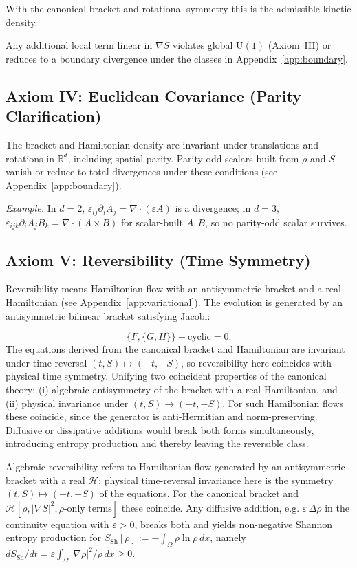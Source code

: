 \documentclass[11pt,a4paper]{article}
\numberwithin{equation}{section}
\theoremstyle{thmcompact}
\theoremstyle{remark}
\begin{document}
With the canonical bracket and rotational symmetry this is the admissible kinetic density.

Any additional local term linear in $\nabla S$ violates global $\mathrm{U}(1)
$ (Axiom~III)
or reduces to a boundary divergence under the classes in Appendix~\ref{app:boundary}.
	
	\subsection*{Axiom IV: Euclidean Covariance (Parity Clarification)}
	The bracket and Hamiltonian density are invariant under translations and rotations in $\mathbb R^d$, including spatial parity.
	Parity-odd scalars built from $\rho$ and $S$ vanish or reduce to total divergences under these conditions (see Appendix~\ref{app:boundary}).
	
	\textit{Example.} In $d=2$, $\varepsilon_{ij}\partial_{i}A_{j}=\nabla\!\cdot(\varepsilon A)$ is a divergence; in $d=3$, $\varepsilon_{ijk}\partial_{i}A_{j}B_{k}=\nabla\!\cdot(A\times B)$ for scalar-built $A,B$, so no parity-odd scalar survives.
	
	\subsection*{Axiom V: Reversibility (Time Symmetry)}
	Reversibility means Hamiltonian flow with an antisymmetric bracket and a real Hamiltonian (see Appendix~\ref{app:variational}). The evolution is generated by an antisymmetric bilinear bracket satisfying Jacobi:

	\[
	\{F,\{G,H\}\}+\mathrm{cyclic}=0.
	\]
	The equations derived from the canonical bracket and Hamiltonian are invariant under time reversal
	$(t,S)\!\mapsto\!(-t,-S)$, so reversibility here coincides with physical time symmetry. Unifying two coincident properties of the canonical theory:
	(i) algebraic antisymmetry of the bracket with a real Hamiltonian, and
	(ii) physical invariance under $(t,S)\!\to\!(-t,-S)$.
	For such Hamiltonian flows these coincide, since the generator is anti-Hermitian and norm-preserving.
	Diffusive or dissipative additions would break both forms simultaneously, introducing entropy production and thereby leaving the reversible class.
	
	Algebraic reversibility refers to Hamiltonian flow generated by an antisymmetric bracket with a real $\mathcal H$; physical time-reversal invariance here is the symmetry $(t,S)\mapsto(-t,-S)$ of the equations. For the canonical bracket and $\mathcal H[\rho,|\nabla S|^{2},\rho\text{-only terms}]$ these coincide. Any diffusive addition, e.g. $\varepsilon\,\Delta\rho$ in the continuity equation with $\varepsilon>0$, breaks both and yields non-negative Shannon entropy production for
	$S_{\mathrm{Sh}}[\rho]:=-\int_{\Omega}\rho\ln\rho\,dx$, namely
	$dS_{\mathrm{Sh}}/dt=\varepsilon\!\int_{\Omega} |\nabla\rho|^{2}/\rho\,dx\ge0$.
		
\end{document}
